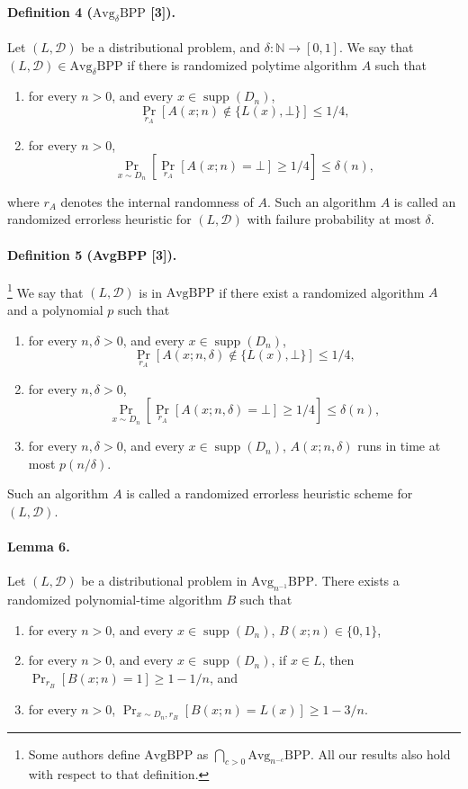 \paragraph{Definition 4 ($\mathrm{Avg}_\delta\mathrm{BPP}$ [3]).} Let $(L,\mathcal D)$ be a distributional problem, and $\delta:\mathbb N\to[0,1]$. We say that $(L,\mathcal D)\in\mathrm{Avg}_\delta\mathrm{BPP}$ if there is randomized polytime algorithm $A$ such that
\begin{enumerate}
\item for every $n>0$, and every $x\in\operatorname{supp}(D_n)$,
\[\Pr_{r_A}[A(x;n)\notin\{L(x),\bot\}]\leq1/4,\]
\item for every $n>0$,
\[\Pr_{x\sim D_n}\left[\Pr_{r_A}[A(x;n)=\bot]\geq1/4\right]\leq\delta(n),\]
\end{enumerate}
where $r_A$ denotes the internal randomness of $A$. Such an algorithm $A$ is called an randomized errorless heuristic for $(L,\mathcal D)$ with failure probability at most $\delta$.
\paragraph{Definition 5 (AvgBPP [3]).}\footnote{Some authors define $\mathrm{AvgBPP}$ as $\bigcap_{c>0}\mathrm{Avg}_{n^{-c}}\mathrm{BPP}$. All our results also hold with respect to that definition.} We say that $(L,\mathcal D)$ is in $\mathrm{AvgBPP}$ if there exist a randomized algorithm $A$ and a polynomial $p$ such that
\begin{enumerate}
\item for every $n,\delta>0$, and every $x\in\operatorname{supp}(D_n)$,
\[\Pr_{r_A}[A(x;n,\delta)\notin\{L(x),\bot\}]\leq1/4,\]
\item for every $n,\delta>0$,
\[\Pr_{x\sim D_n}\left[\Pr_{r_A}[A(x;n,\delta)=\bot]\geq1/4\right]\leq\delta(n),\]
\item for every $n,\delta>0$, and every $x\in\operatorname{supp}(D_n)$, $A(x;n,\delta)$ runs in time at most $p(n/\delta)$.
\end{enumerate}
Such an algorithm $A$ is called a randomized errorless heuristic scheme for $(L,\mathcal D)$.
\paragraph{Lemma 6.} Let $(L,\mathcal D)$ be a distributional problem in $\mathrm{Avg}_{n^{-1}}\mathrm{BPP}$. There exists a randomized polynomial-time algorithm $B$ such that
\begin{enumerate}
\item for every $n>0$, and every $x\in\operatorname{supp}(D_n)$, $B(x;n)\in\{0,1\}$,
\item for every $n>0$, and every $x\in\operatorname{supp}(D_n)$, if $x\in L$, then $\Pr_{r_B}[B(x;n)=1]\geq1-1/n$, and
\item for every $n>0$, $\Pr_{x\sim D_n,r_B}[B(x;n)=L(x)]\geq1-3/n$.
\end{enumerate}
